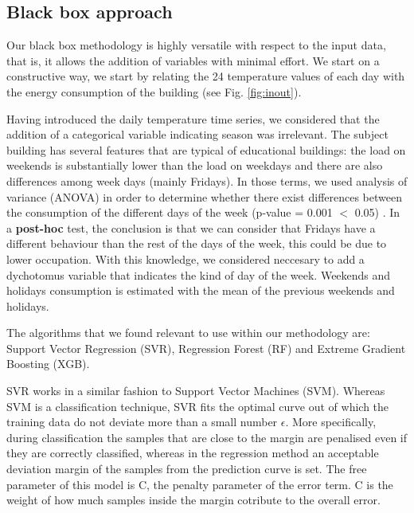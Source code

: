 \documentclass[10pt, conference, compsocconf]{IEEEtran}
\begin{document}
\subsection{Black box approach}

Our black box methodology is highly versatile with respect to the input data, that is, it allows the addition of variables with minimal effort. We start on a constructive way, we start by relating the 24 temperature values of each day with the energy consumption of the building (see Fig. \ref{fig:inout}).

Having introduced the daily temperature time series, we considered that the addition of a categorical variable indicating season was irrelevant. The subject building has several features that are typical of educational buildings: the load %
on weekends is substantially lower than the load on weekdays and there are also differences among week days (mainly Fridays).
In those terms, we used analysis of variance (ANOVA) in order to determine whether there exist differences between the consumption of the different days of the week (p-value = 0.001 $<$ 0.05) . 	In a \textbf{post-hoc}  test, the conclusion is that we can consider that Fridays have a different behaviour than the rest of the days of the week, this could be due to lower occupation. With this knowledge, we considered neccesary to add a dychotomus variable that indicates the kind of day of the week. Weekends and holidays consumption is estimated with the mean of the previous weekends and holidays.

The algorithms that we found relevant to use within our methodology are: Support Vector Regression (SVR), Regression Forest (RF) and Extreme Gradient Boosting (XGB). 

SVR works in a similar fashion to Support Vector Machines (SVM). Whereas SVM is a classification technique, SVR fits the optimal curve out of which the training data do not deviate more than a small number $\epsilon$. More specifically, during classification the samples that are close to the margin are penalised even if they are correctly classified, whereas in the regression method an acceptable deviation margin of the samples from the prediction curve is set.
The free parameter of this model is C, the penalty parameter of the error term. C is the weight of how much samples inside the margin cotribute to the overall error.%
\end{document}
